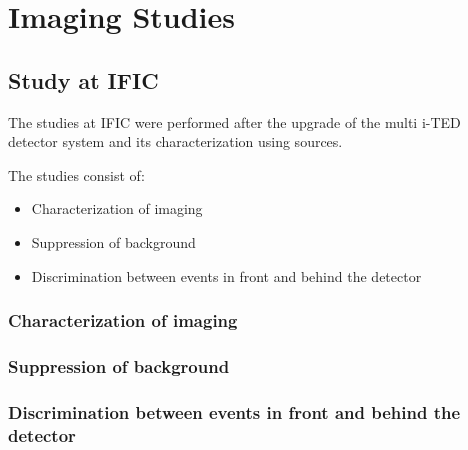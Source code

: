 \chapter{Imaging Studies}\label{ch:performance}

\section{Study at \ac{IFIC}}

The studies at \ac{IFIC} were performed after the upgrade of the multi \ac{i-TED} detector system and its characterization using sources.

The studies consist of:
\begin{itemize}
    \item Characterization of imaging
    \item Suppression of background
    \item Discrimination between events in front and behind the detector
\end{itemize}

\subsection{Characterization of imaging}

\subsection{Suppression of background}

\subsection{Discrimination between events in front and behind the detector}

